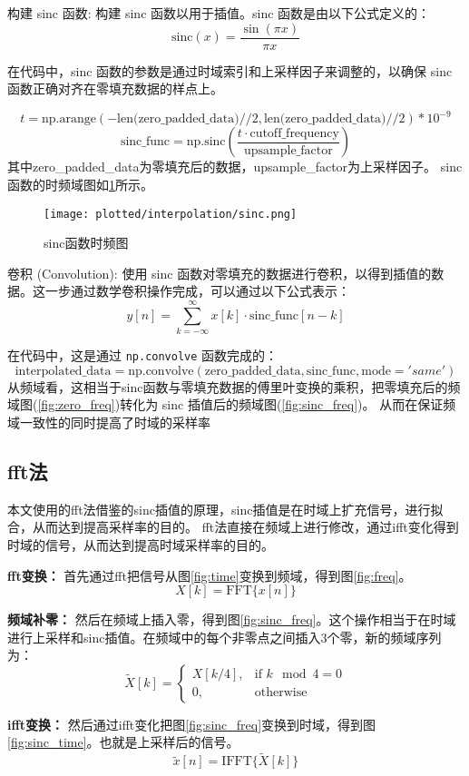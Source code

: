 构建 sinc 函数:
构建 sinc 函数以用于插值。sinc 函数是由以下公式定义的：
\[
    \text{sinc}(x) = \dfrac{\sin(\pi x)}{\pi x}
\]

在代码中，sinc 函数的参数是通过时域索引和上采样因子来调整的，以确保 sinc 函数正确对齐在零填充数据的样点上。

\[
    t = \text{np.arange}(-\text{len(zero\_padded\_data)}//2, \text{len(zero\_padded\_data)}//2) * 10^{-9}
\]
\[
    \text{sinc\_func} = \text{np.sinc}(\frac{t \cdot \text{cutoff\_frequency}}{\text{upsample\_factor} })
\]
其中zero\_padded\_data为零填充后的数据，upsample\_factor为上采样因子。
sinc函数的时频域图如\ref{fig:sinc}所示。
\begin{figure}[htbp]
    \centering
    \texttt{[image: plotted/interpolation/sinc.png]}
    \caption{\label{fig:sinc}sinc函数时频图}
\end{figure}

卷积 (Convolution):
使用 sinc 函数对零填充的数据进行卷积，以得到插值的数据。这一步通过数学卷积操作完成，可以通过以下公式表示：
\[
    y[n] = \sum_{k=-\infty}^{\infty} x[k] \cdot \text{sinc\_func}[n - k]
\]

在代码中，这是通过 \texttt{np.convolve} 函数完成的：
\[
    \text{interpolated\_data} = \text{np.convolve}(\text{zero\_padded\_data}, \text{sinc\_func}, \text{mode}='same')
\]
从频域看，这相当于sinc函数与零填充数据的傅里叶变换的乘积，把零填充后的频域图(\ref{fig:zero_freq})转化为 sinc 插值后的频域图(\ref{fig:sinc_freq})。
从而在保证频域一致性的同时提高了时域的采样率

\subsection{fft法}
本文使用的fft法借鉴的sinc插值的原理，sinc插值是在时域上扩充信号，进行拟合，从而达到提高采样率的目的。
fft法直接在频域上进行修改，通过ifft变化得到时域的信号，从而达到提高时域采样率的目的。

\textbf{fft变换：}
首先通过fft把信号从图\ref{fig:time}变换到频域，得到图\ref{fig:freq}。
\[ X[k] = \text{FFT}\{ x[n] \} \]

\textbf{频域补零：}
然后在频域上插入零，得到图\ref{fig:sinc_freq}。这个操作相当于在时域进行上采样和sinc插值。在频域中的每个非零点之间插入3个零，新的频域序列为：
\[ \tilde{X}[k] = \begin{cases}
X[k/4], & \text{if } k \mod 4 = 0 \\
0, & \text{otherwise}
\end{cases} \]

\textbf{ifft变换：}
然后通过ifft变化把图\ref{fig:sinc_freq}变换到时域，得到图\ref{fig:sinc_time}。也就是上采样后的信号。
\[ \tilde{x}[n] = \text{IFFT}\{ \tilde{X}[k] \} \]

